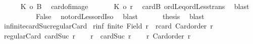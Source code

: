 \begin{isabellebody}
\ \ \ \ \isamarkupfalse%
\ {\isachardoublequoteopen}{\isacharbar}{\kern0pt}{\isacharquery}{\kern0pt}K{\isacharbar}{\kern0pt}\ {\isacharless}{\kern0pt}{\isacharequal}{\kern0pt}o\ {\isacharbar}{\kern0pt}B{\isacharbar}{\kern0pt}{\isachardoublequoteclose}\ \isamarkupfalse%
\ card{\isacharunderscore}{\kern0pt}of{\isacharunderscore}{\kern0pt}image\ \isacommand{{\isachardot}{\kern0pt}}\isamarkupfalse%
\isanewline
\ \ \ \ \isamarkupfalse%
\ {\isachardoublequoteopen}{\isacharbar}{\kern0pt}{\isacharquery}{\kern0pt}K{\isacharbar}{\kern0pt}\ {\isacharless}{\kern0pt}o\ r{\isachardoublequoteclose}\ \isamarkupfalse%
\ cardB\ ordLeq{\isacharunderscore}{\kern0pt}ordLess{\isacharunderscore}{\kern0pt}trans\ \isamarkupfalse%
\ blast\isanewline
\ \ \ \isacommand{{\isacharbraceright}{\kern0pt}}\isamarkupfalse%
\isanewline
\ \ \ \isamarkupfalse%
\ \isamarkupfalse%
\ False\ \isamarkupfalse%
\ not{\isacharunderscore}{\kern0pt}ordLess{\isacharunderscore}{\kern0pt}ordIso\ \isamarkupfalse%
\ blast\isanewline
\ \ \isacommand{{\isacharbraceright}{\kern0pt}}\isamarkupfalse%
\isanewline
\ \ \isamarkupfalse%
\ {\isacharquery}{\kern0pt}thesis\ \isamarkupfalse%
\ blast\isanewline
{}\isamarkupfalse%
%
\endisatagproof
{\isafoldproof}%
%
\isadelimproof
\isanewline
%
\endisadelimproof
\isanewline
{}\isamarkupfalse%
\ infinite{\isacharunderscore}{\kern0pt}cardSuc{\isacharunderscore}{\kern0pt}regularCard{\isacharcolon}{\kern0pt}\isanewline
{}\ r{\isacharunderscore}{\kern0pt}inf{\isacharcolon}{\kern0pt}\ {\isachardoublequoteopen}{\isasymnot}finite\ {\isacharparenleft}{\kern0pt}Field\ r{\isacharparenright}{\kern0pt}{\isachardoublequoteclose}\ \ r{\isacharunderscore}{\kern0pt}card{\isacharcolon}{\kern0pt}\ {\isachardoublequoteopen}Card{\isacharunderscore}{\kern0pt}order\ r{\isachardoublequoteclose}\isanewline
{}\ {\isachardoublequoteopen}regularCard\ {\isacharparenleft}{\kern0pt}cardSuc\ r{\isacharparenright}{\kern0pt}{\isachardoublequoteclose}\isanewline
%
\isadelimproof
%
\endisadelimproof
%
\isatagproof
{}\isamarkupfalse%
{\isacharminus}{\kern0pt}\isanewline
\ \ \isamarkupfalse%
\ {\isacharquery}{\kern0pt}r{\isacharprime}{\kern0pt}\ {\isacharequal}{\kern0pt}\ {\isachardoublequoteopen}cardSuc\ r{\isachardoublequoteclose}\isanewline
\ \ \isamarkupfalse%
\ r{\isacharprime}{\kern0pt}{\isacharcolon}{\kern0pt}\ {\isachardoublequoteopen}Card{\isacharunderscore}{\kern0pt}order\ {\isacharquery}{\kern0pt}r{\isacharprime}{\kern0pt}{\isachardoublequoteclose}\isanewline

\end{isabellebody}
